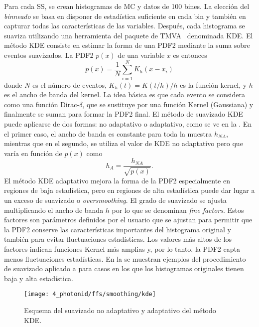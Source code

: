 Para cada \ac{SS}, se crean histogramas de \ac{MC} y datos de 100 bines. La elección del \textit{binneado} se basa en disponer de estadística suficiente en cada bin y también en capturar todas las características de las variables.
Después, cada histograma se suaviza utilizando una herramienta del paquete de TMVA~\cite{TMVA} denominada \acf{KDE}. El método \ac{KDE} consiste en estimar la forma de una \acf{PDF2} mediante la suma sobre eventos suavizados. La \ac{PDF2} \(p(x)\) de una variable \(x\) es entonces
\begin{equation*}
	p(x) = \frac{1}{N}\sum_{i=1}^{N} K_h(x-x_i)
\end{equation*}
donde \(N\) es el número de eventos, \(K_h(t) = K(t/h)/h\) es la función kernel, y \(h\) es el ancho de banda del kernel. La idea básica es que cada evento se considera como una función Dirac-\(\delta\), que se sustituye por una función Kernel (Gaussiana) y finalmente se suman para formar la \ac{PDF2} final. El m\'etodo de suavizado \ac{KDE} puede aplicarse de dos formas: no adaptativo o adaptativo, como se ve en la \Fig{\ref{fig:ss_corrections:ffs:calculation:adaptive_nonadaptive_kde}}. En el primer caso, el ancho de banda es constante para toda la muestra \(h_{NA}\), mientras que en el segundo, se utiliza el valor de \ac{KDE} no adaptativo pero que varía en función de \(p(x)\) como
\begin{equation*}
	h_A = \frac{h_{NA}}{\sqrt{p(x)}}.
\end{equation*}
El m\'etodo \ac{KDE} adaptativo mejora la forma de la \ac{PDF2} especialmente en regiones de baja estadística, pero en regiones de alta estadística puede dar lugar a un exceso de suavizado o \textit{oversmoothing}. El grado de suavizado se ajusta multiplicando el ancho de banda \(h\) por lo que se denominan \textit{fine factors}.
Estos factores son parámetros definidos por el usuario que se ajustan para permitir que la \ac{PDF2} conserve las características importantes del histograma original y también para evitar fluctuaciones estadísticas. Los valores más altos de los factores indican funciones Kernel más amplias y, por lo tanto, la \ac{PDF2} capta menos fluctuaciones estadísticas.
En la \Fig{\ref{fig:ss_corrections:ffs:calculation:smoothing_ss}} se muestran ejemplos del procedimiento de suavizado aplicado a \rhad para casos en los que los histogramas originales tienen baja y alta estadística.

\begin{figure}[ht!]
    \centering
    \texttt{[image: 4\_photonid/ffs/smoothing/kde]}
    \caption{Esquema del suavizado no adaptativo y adaptativo del m\'etodo \ac{KDE}.}
    \label{fig:ss_corrections:ffs:calculation:adaptive_nonadaptive_kde}
\end{figure}

